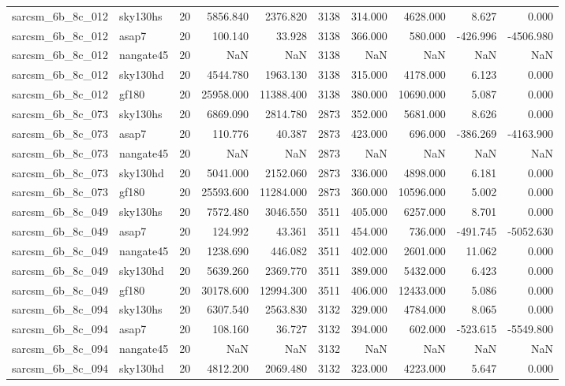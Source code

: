 \documentclass{article}
\begin{document}
\begin{longtable}{llrrrrrrrr}
sarcsm\_6b\_8c\_012 & sky130hs & 20 & 5856.840 & 2376.820 & 3138 & 314.000 & 4628.000 & 8.627 & 0.000 \\
sarcsm\_6b\_8c\_012 & asap7 & 20 & 100.140 & 33.928 & 3138 & 366.000 & 580.000 & -426.996 & -4506.980 \\
sarcsm\_6b\_8c\_012 & nangate45 & 20 & NaN & NaN & 3138 & NaN & NaN & NaN & NaN \\
sarcsm\_6b\_8c\_012 & sky130hd & 20 & 4544.780 & 1963.130 & 3138 & 315.000 & 4178.000 & 6.123 & 0.000 \\
sarcsm\_6b\_8c\_012 & gf180 & 20 & 25958.000 & 11388.400 & 3138 & 380.000 & 10690.000 & 5.087 & 0.000 \\
sarcsm\_6b\_8c\_073 & sky130hs & 20 & 6869.090 & 2814.780 & 2873 & 352.000 & 5681.000 & 8.626 & 0.000 \\
sarcsm\_6b\_8c\_073 & asap7 & 20 & 110.776 & 40.387 & 2873 & 423.000 & 696.000 & -386.269 & -4163.900 \\
sarcsm\_6b\_8c\_073 & nangate45 & 20 & NaN & NaN & 2873 & NaN & NaN & NaN & NaN \\
sarcsm\_6b\_8c\_073 & sky130hd & 20 & 5041.000 & 2152.060 & 2873 & 336.000 & 4898.000 & 6.181 & 0.000 \\
sarcsm\_6b\_8c\_073 & gf180 & 20 & 25593.600 & 11284.000 & 2873 & 360.000 & 10596.000 & 5.002 & 0.000 \\
sarcsm\_6b\_8c\_049 & sky130hs & 20 & 7572.480 & 3046.550 & 3511 & 405.000 & 6257.000 & 8.701 & 0.000 \\
sarcsm\_6b\_8c\_049 & asap7 & 20 & 124.992 & 43.361 & 3511 & 454.000 & 736.000 & -491.745 & -5052.630 \\
sarcsm\_6b\_8c\_049 & nangate45 & 20 & 1238.690 & 446.082 & 3511 & 402.000 & 2601.000 & 11.062 & 0.000 \\
sarcsm\_6b\_8c\_049 & sky130hd & 20 & 5639.260 & 2369.770 & 3511 & 389.000 & 5432.000 & 6.423 & 0.000 \\
sarcsm\_6b\_8c\_049 & gf180 & 20 & 30178.600 & 12994.300 & 3511 & 406.000 & 12433.000 & 5.086 & 0.000 \\
sarcsm\_6b\_8c\_094 & sky130hs & 20 & 6307.540 & 2563.830 & 3132 & 329.000 & 4784.000 & 8.065 & 0.000 \\
sarcsm\_6b\_8c\_094 & asap7 & 20 & 108.160 & 36.727 & 3132 & 394.000 & 602.000 & -523.615 & -5549.800 \\
sarcsm\_6b\_8c\_094 & nangate45 & 20 & NaN & NaN & 3132 & NaN & NaN & NaN & NaN \\
sarcsm\_6b\_8c\_094 & sky130hd & 20 & 4812.200 & 2069.480 & 3132 & 323.000 & 4223.000 & 5.647 & 0.000 \\

\end{longtable}
\end{document}
